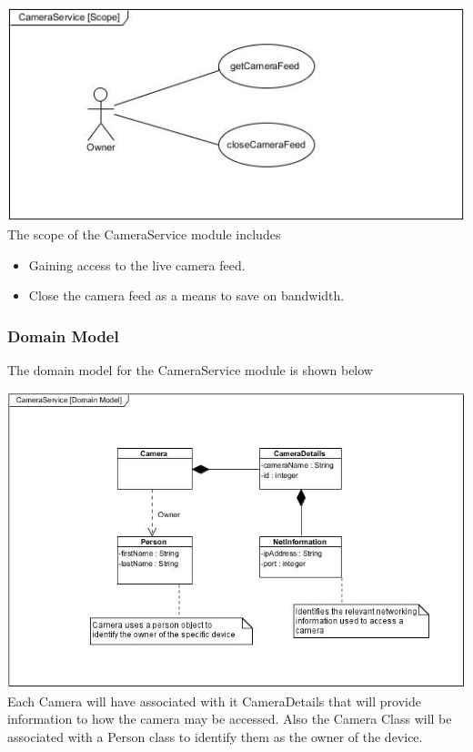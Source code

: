 \documentclass[a4paper,12pt]{article}
\begin{document}
	\includegraphics[width=1\textwidth]{./Pictures/UML/Usecase/CameraServiceUseCase.jpg}\\[0cm]
	
	{\noindent}The scope of the CameraService module includes
	\begin{itemize}
		\item Gaining access to the live camera feed.
		\item Close the camera feed as a means to save on bandwidth.
	\end{itemize}
	
	\subsubsection{Domain Model}
	The domain model for the CameraService module is shown below
	
	\includegraphics[width=1\textwidth]{./Pictures/UML/CameraServiceDomain.jpg}\\[1.5cm]	
	
	{\noindent}Each Camera will have associated with it CameraDetails that will provide information to how the camera may be accessed. Also the Camera Class will be associated with a Person class to identify them as the owner of the device.
	
\end{document}
